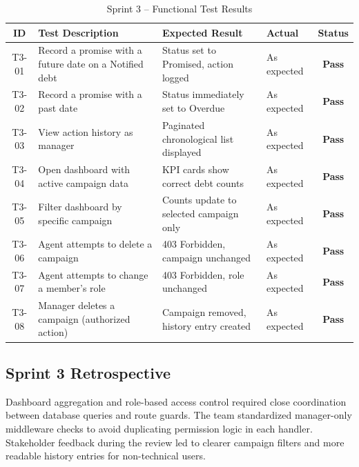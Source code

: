 \documentclass[12pt,a4paper]{report}
\newcommand{\reporttablesetup}{%
  \small%
  \setlength{\tabcolsep}{5pt}%
  \renewcommand{\arraystretch}{1.38}%
  \arrayrulecolor{framegray}%
}
\newcommand{\tpass}{\textcolor{passgreen}{\textbf{Pass}}}
\begin{document}
\begin{table}[H]
  \centering
  \renewcommand{\arraystretch}{1.3}
  \footnotesize\reporttablesetup
  \begin{tabularx}{\textwidth}{|c|Y|Y|>{\centering\arraybackslash}p{1.8cm}|c|}
    \hline
    \textbf{ID} & \textbf{Test Description} & \textbf{Expected Result} & \textbf{Actual} & \textbf{Status} \\
    \hline
    T3-01 & Record a promise with a future date on a Notified debt  & Status set to Promised, action logged       & As expected & \tpass \\
    \hline
    T3-02 & Record a promise with a past date                       & Status immediately set to Overdue           & As expected & \tpass \\
    \hline
    T3-03 & View action history as manager                          & Paginated chronological list displayed      & As expected & \tpass \\
    \hline
    T3-04 & Open dashboard with active campaign data                & KPI cards show correct debt counts          & As expected & \tpass \\
    \hline
    T3-05 & Filter dashboard by specific campaign                   & Counts update to selected campaign only     & As expected & \tpass \\
    \hline
    T3-06 & Agent attempts to delete a campaign                     & 403 Forbidden, campaign unchanged           & As expected & \tpass \\
    \hline
    T3-07 & Agent attempts to change a member's role               & 403 Forbidden, role unchanged               & As expected & \tpass \\
    \hline
    T3-08 & Manager deletes a campaign (authorized action)          & Campaign removed, history entry created     & As expected & \tpass \\
    \hline
  \end{tabularx}
  \caption{Sprint 3 -- Functional Test Results}
  \label{tab:test-s3}
\end{table}

\subsection{Sprint 3 Retrospective}

Dashboard aggregation and role-based access control required close coordination between
database queries and route guards.
The team standardized manager-only middleware checks to avoid duplicating permission logic in
each handler.
Stakeholder feedback during the review led to clearer campaign filters and more readable
history entries for non-technical users.
\end{document}
